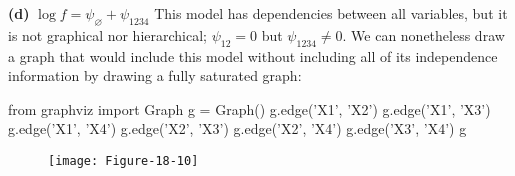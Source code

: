 \textbf{(d)} \(\log f = \psi_\varnothing + \psi_{1234}\)
This model has dependencies between all variables, but it is not
graphical nor hierarchical; \(\psi_{12} = 0\) but
\(\psi_{1234} \neq 0\). We can nonetheless draw a graph that would
include this model without including all of its independence information
by drawing a fully saturated graph:

\begin{python}
from graphviz import Graph
g = Graph()
g.edge('X1', 'X2')
g.edge('X1', 'X3')
g.edge('X1', 'X4')
g.edge('X2', 'X3')
g.edge('X2', 'X4')
g.edge('X3', 'X4')
g
\end{python}

\begin{figure}[H]
\centering
\texttt{[image: Figure-18-10]}
\end{figure}

